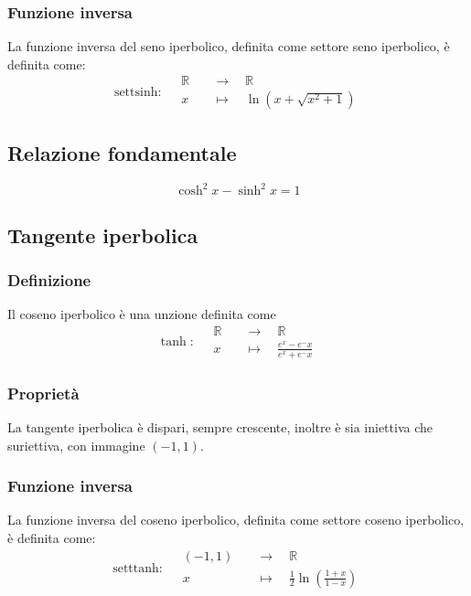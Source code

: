 \documentclass[a4paper]{article}
\newcommand\settsinh{\text{settsinh}}
\newcommand\setttanh{\text{setttanh}}
\begin{document}
\subsubsection*{Funzione inversa}
La funzione inversa del seno iperbolico, definita come settore seno iperbolico, è definita come:
\[\settsinh : \quad
\begin{aligned}
	\mathbb{R} \quad &\to \quad \mathbb{R} \\
	x \quad &\mapsto \quad \ln \left( x + \sqrt{ x^2 + 1 } \right)
\end{aligned}
\]

\subsection{Relazione fondamentale}
\[\cosh^2 x - \sinh^2 x = 1\]

\subsection{Tangente iperbolica}
\subsubsection*{Definizione}
Il coseno iperbolico è una unzione definita come
\[\tanh : \quad
\begin{aligned}
	\mathbb{R} \quad &\to \quad \mathbb{R} \\
	x \quad &\mapsto \quad \frac{e^x - e^-x}{e^x + e^-x}
\end{aligned}	
\]

\subsubsection*{Proprietà}
La tangente iperbolica è dispari, sempre crescente, inoltre è sia iniettiva che suriettiva, con immagine \(\left( -1, 1 \right)\).

\subsubsection*{Funzione inversa}
La funzione inversa del coseno iperbolico, definita come settore coseno iperbolico, è definita come:
\[\setttanh : \quad
\begin{aligned}
	\left( -1, 1 \right) \quad &\to \quad \mathbb{R} \\
	x \quad &\mapsto \quad \frac{1}{2} \ln \left( \frac{1 + x}{1 - x} \right)
\end{aligned}
\]
\end{document}
